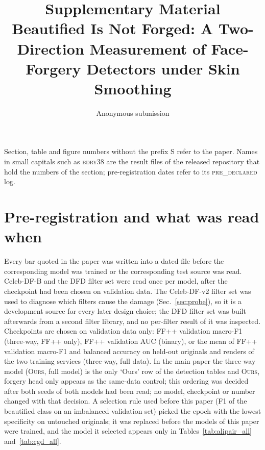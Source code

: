 \documentclass[10pt]{article}
\title{Supplementary Material\\Beautified Is Not Forged: A Two-Direction Measurement of Face-Forgery Detectors under Skin Smoothing}
\author{Anonymous submission}\date{}
\newcommand{\oursB}{\textsc{Ours}, forgery head only}
\newcommand{\oursF}{\textsc{Ours}, full model}
\begin{document}
\maketitle
Section, table and figure numbers without the prefix S refer to the paper. Names in small capitals such as \textsc{bdry38} are the result files of the released repository that hold the numbers of the section; pre-registration dates refer to its \textsc{pre\_declared} log.

\section{Pre-registration and what was read when}
\label{sec:prereg}
Every bar quoted in the paper was written into a dated file before the corresponding model was trained or the corresponding test
source was read. Celeb-DF-B and the DFD filter set were read once per model, after the checkpoint had been chosen on validation
data. The Celeb-DF-v2 filter set was used to diagnose which filters cause the damage (Sec.~\ref{sec:probe}), so it is a
development source for every later design choice; the DFD filter set was built afterwards from a second filter library, and no
per-filter result of it was inspected. Checkpoints are chosen on validation data only: FF++ validation macro-F1 (three-way, FF++
only), FF++ validation AUC (binary), or the mean of FF++ validation macro-F1 and balanced accuracy on held-out originals and
renders of the two training services (three-way, full data). In the main paper the three-way model
(\oursF{}) is the only `Ours' row of the detection tables and \oursB{} appears as the same-data control; this ordering was
decided after both seeds of both models had been read; no model, checkpoint or number changed with that decision. A selection rule used before this paper (F1 of the beautified class
on an imbalanced validation set) picked the epoch with the lowest specificity on untouched originals; it was replaced before the
models of this paper were trained, and the model it selected appears only in Tables~\ref{tab:alipair_all} and~\ref{tab:cgd_all}.
\end{document}
